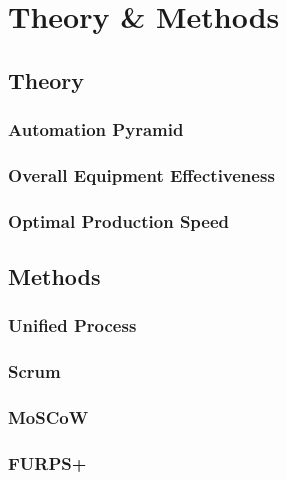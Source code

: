 \section{Theory \& Methods}
\subsection{Theory}
\subsubsection{Automation Pyramid}
\subsubsection{Overall Equipment Effectiveness}
\subsubsection{Optimal Production Speed}
\subsection{Methods}
\subsubsection{Unified Process}
\subsubsection{Scrum}
\subsubsection{MoSCoW}
\subsubsection{FURPS+}
